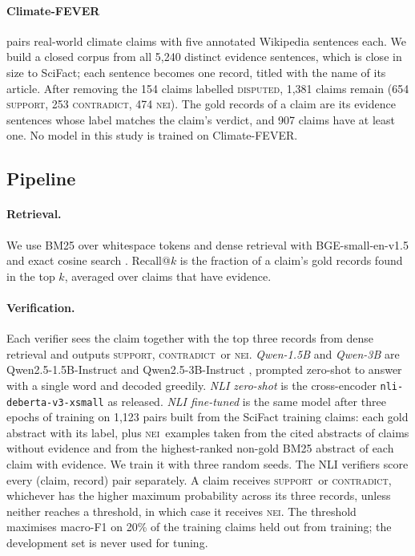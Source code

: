 \documentclass[11pt]{article}
\newcommand{\Sup}{\textsc{support}}
\newcommand{\Con}{\textsc{contradict}}
\newcommand{\Nei}{\textsc{nei}}
\begin{document}
\paragraph{Climate-FEVER} pairs real-world climate claims with five annotated Wikipedia sentences each. We
build a closed corpus from all 5,240 distinct evidence sentences, which is close in size to SciFact; each
sentence becomes one record, titled with the name of its article. After removing the 154 claims labelled
\textsc{disputed}, 1,381 claims remain (654 \Sup, 253 \Con, 474 \Nei). The gold records of a claim are
its evidence sentences whose label matches the claim's verdict, and 907 claims have at least one. No model
in this study is trained on Climate-FEVER.

\subsection{Pipeline}
\paragraph{Retrieval.} We use BM25 \citep{robertson2009bm25} over whitespace tokens and dense retrieval with
BGE-small-en-v1.5 \citep{xiao2023cpack} and exact cosine search \citep{johnson2019faiss}. Recall@$k$ is the
fraction of a claim's gold records found in the top $k$, averaged over claims that have evidence.

\paragraph{Verification.} Each verifier sees the claim together with the top three records from dense
retrieval and outputs \Sup, \Con\ or \Nei. \emph{Qwen-1.5B} and \emph{Qwen-3B} are Qwen2.5-1.5B-Instruct
and Qwen2.5-3B-Instruct \citep{qwen2024qwen25}, prompted zero-shot to answer with a single word and decoded
greedily. \emph{NLI zero-shot} is the cross-encoder \texttt{nli-deberta-v3-xsmall} \citep{he2023debertav3}
as released. \emph{NLI fine-tuned} is the same model after three epochs of training on 1,123 pairs built
from the SciFact training claims: each gold abstract with its label, plus \Nei\ examples taken from the
cited abstracts of claims without evidence and from the highest-ranked non-gold BM25 abstract of each claim
with evidence. We train it with three random seeds. The NLI verifiers score every (claim, record) pair
separately. A claim receives \Sup\ or \Con, whichever has the higher maximum probability across its three
records, unless neither reaches a threshold, in which case it receives \Nei. The threshold maximises
macro-F1 on 20\% of the training claims held out from training; the development set is never used for
tuning.
\end{document}
